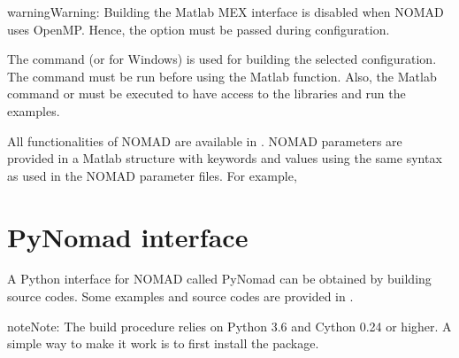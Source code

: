 \documentclass[letterpaper,10pt,english]{sphinxmanual}
\begin{document}
\begin{sphinxadmonition}{warning}{Warning:}
\sphinxAtStartPar
Building the Matlab MEX interface is disabled when NOMAD uses OpenMP. Hence, the option  must be passed during configuration.
\end{sphinxadmonition}

\sphinxAtStartPar
The command  (or  for Windows) is used for building the selected configuration.
The command  must be run before using the Matlab  function. Also,
the Matlab command  or  must be executed to have access to the libraries and run the examples.

\sphinxAtStartPar
All functionalities of NOMAD are available in .
NOMAD parameters are provided in a Matlab structure with keywords and values using the same syntax as used in the NOMAD parameter
files. For example, 


\chapter{PyNomad interface}
\label{\detokenize{LibraryMode:pynomad-interface}}
\sphinxAtStartPar
A Python interface for NOMAD called PyNomad can be obtained by building source codes.
Some examples and source codes are provided in .

\begin{sphinxadmonition}{note}{Note:}
\sphinxAtStartPar
The build procedure relies on Python 3.6 and Cython 0.24 or higher. A simple way to make it work is to first install the  package.
\end{sphinxadmonition}
\end{document}
